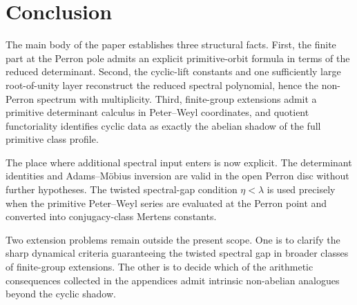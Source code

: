 \section{Conclusion}\label{sec:conclusion}

The main body of the paper establishes three structural facts. First,
the finite part at the Perron pole admits an explicit primitive-orbit
formula in terms of the reduced determinant. Second, the cyclic-lift
constants and one sufficiently large root-of-unity layer reconstruct
the reduced spectral polynomial, hence the non-Perron spectrum with
multiplicity. Third, finite-group extensions admit a primitive
determinant calculus in Peter--Weyl coordinates, and quotient
functoriality identifies cyclic data as exactly the abelian shadow of
the full primitive class profile.

The place where additional spectral input enters is now explicit. The
determinant identities and Adams--M\"obius inversion are valid in the
open Perron disc without further hypotheses. The twisted spectral-gap
condition \(\eta<\lambda\) is used precisely when the primitive
Peter--Weyl series are evaluated at the Perron point and converted into
conjugacy-class Mertens constants.

Two extension problems remain outside the present scope. One is to
clarify the sharp dynamical criteria guaranteeing the twisted spectral
gap in broader classes of finite-group extensions. The other is to
decide which of the arithmetic consequences collected in the appendices
admit intrinsic non-abelian analogues beyond the cyclic shadow.
